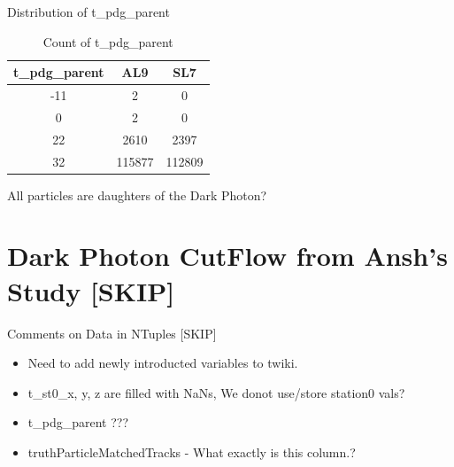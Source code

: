 \begin{frame}{Distribution of t\_pdg\_parent}
    \begin{table}[h!]
        \centering
        \small
        \begin{tabular}{|c|c|c|}
        \hline
        t\_pdg\_parent  & AL9       & SL7       \\ \hline
        -11             & 2         & 0         \\
        0               & 2         & 0         \\
        22              & 2610      & 2397      \\
        32              & 115877    & 112809    \\ \hline
        \end{tabular}
        \caption{Count of t\_pdg\_parent}
        \label{table:truth_efficiency}
        All particles are daughters of the Dark Photon? 
    \end{table}
    
\end{frame}

\section{Dark Photon CutFlow from Ansh's Study [SKIP]}
    

\begin{frame}{Comments on Data in NTuples [SKIP]}
    \begin{itemize}
        \item Need to add newly introducted variables to twiki.
        \item t\_st0\_x, y, z are filled with NaNs, We donot use/store station0 vals?
        \item t\_pdg\_parent ???
        \item truthParticleMatchedTracks - What exactly is this column.?
    \end{itemize}
    
\end{frame}